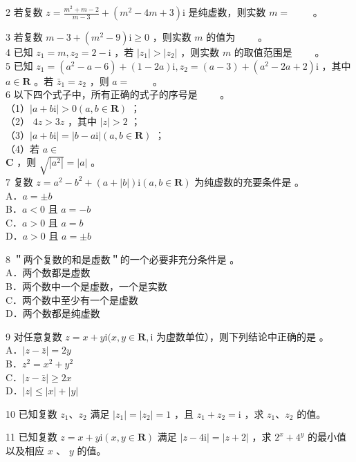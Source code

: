 \documentclass[10pt]{article}
\begin{document}
2 若复数 \(z=\frac{m^{2}+m-2}{m-3}+\left(m^{2}-4 m+3\right) \mathrm{i}\) 是纯虚数，则实数 \(m=\) \(\qquad\)。

3 若复数 \(m-3+\left(m^{2}-9\right) \mathrm{i} \geqslant 0\) ，则实数 \(m\) 的值为 \(\qquad\)。\\
4 已知 \(z_{1}=m, z_{2}=2-\mathrm{i}\) ，若 \(\left|z_{1}\right|>\left|z_{2}\right|\) ，则实数 \(m\) 的取值范围是 \(\qquad\)。\\
5 已知 \(z_{1}=\left(a^{2}-a-6\right)+(1-2 a) \mathrm{i}, z_{2}=(a-3)+\left(a^{2}-2 a+2\right) \mathrm{i}\) ，其中 \(a \in \mathbf{R}\) 。若 \(\bar{z}_{1}=z_{2}\) ，则 \(a=\) \(\qquad\)。\\
6 以下四个式子中，所有正确的式子的序号是 \(\qquad\)。\\
（1）\(|a+b \mathrm{i}|>0(a, b \in \mathbf{R})\) ；\\
（2） \(4 z>3 z\) ，其中 \(|z|>2\) ；\\
（3）\(|a+b \mathrm{i}|=|b-a \mathrm{i}|(a, b \in \mathbf{R})\) ；\\
（4）若 \(a \in\)\\
\(\mathbf{C}\) ，则 \(\sqrt{\left|a^{2}\right|}=|a|\) 。\\
7 复数 \(z=a^{2}-b^{2}+(a+|b|) \mathrm{i}(a, b \in \mathbf{R})\) 为纯虚数的充要条件是 。\\
A．\(a= \pm b\)\\
B．\(a<0\) 且 \(a=-b\)\\
C．\(a>0\) 且 \(a=b\)\\
D．\(a>0\) 且 \(a= \pm b\)

8 ＂两个复数的和是虚数＂的一个必要非充分条件是 。\\
A．两个数都是虚数\\
B．两个数中一个是虚数，一个是实数\\
C．两个数中至少有一个是虚数\\
D．两个数都是纯虚数

9 对任意复数 \(z=x+y \mathrm{i}(x, y \in \mathbf{R}, \mathrm{i}\) 为虚数单位），则下列结论中正确的是 。\\
A．\(|z-\bar{z}|=2 y\)\\
B．\(z^{2}=x^{2}+y^{2}\)\\
C．\(|z-\bar{z}| \geqslant 2 x\)\\
D．\(|z| \leqslant|x|+|y|\)

10 已知复数 \(z_{1} 、 z_{2}\) 满足 \(\left|z_{1}\right|=\left|z_{2}\right|=1\) ，且 \(z_{1}+z_{2}=\mathrm{i}\) ，求 \(z_{1} 、 z_{2}\) 的值。

11 已知复数 \(z=x+y \mathrm{i}(x, y \in \mathbf{R})\) 满足 \(|z-4 \mathrm{i}|=|z+2|\) ，求 \(2^{x}+4^{y}\) 的最小值以及相应 \(x\) 、 \(y\) 的值。
\end{document}
